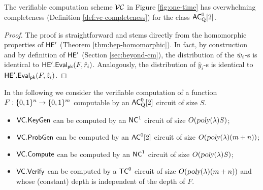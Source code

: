 \begin{lemma}[Completeness of $\VC$]
The verifiable computation scheme $\VC$ in Figure \ref{fig:one-time} has overwhelming completeness (Definition \ref{def:vc-completeness}) for the class ${\mathsf{AC}}^0_{\text{Q}}[2]$.
\end{lemma}
\begin{proof}
The proof is straightforward and stems directly from the homomorphic properties of $\mathsf{HE'}$ (Theorem \ref{thm:hep-homomorphic}).
In fact, by construction and by definition of $\mathsf{HE'}$ (Section \ref{sec:beyond-cm}), the distribution of the $\hat{w}_i$-s is identical to $\mathsf{HE'.Eval}_{\mathsf{pk}}(F, \hat{r}_i)$. Analogously, the distribution of $\hat{y}_i$-s is identical to $\mathsf{HE'.Eval}_{\mathsf{pk}}(F, \hat{z}_i)$. 
\end{proof}


\begin{remark}[Efficiency of $\VC$]
In the following we consider the verifiable computation of a function $F: \{0, 1\}^n \to \{0, 1\}^m$ computable by an ${\mathsf{AC}}^0_{\text{Q}}[2]$ circuit of size $S$.
\begin{itemize}
\item  $\mathsf{VC.KeyGen}$ can be computed by an ${\mathsf{NC}}^1$ circuit of size $O({\textsl{poly}}(\lambda)S)$; 
\item $\mathsf{VC.ProbGen}$ can be computed by an ${\mathsf{AC}}^0[2]$ circuit of size $O({\textsl{poly}}(\lambda)(m+n))$;
\item $\mathsf{VC.Compute}$ can be computed by an ${\mathsf{NC}}^1$ circuit of size $O({\textsl{poly}}(\lambda)S)$; 
\item $\mathsf{VC.Verify}$ can be computed by a ${\mathsf{TC}}^0$ circuit of size $O({\textsl{poly}}(\lambda)(m+n))$ and whose (constant) depth is independent of the depth of $F$.
\end{itemize}
\end{remark}

